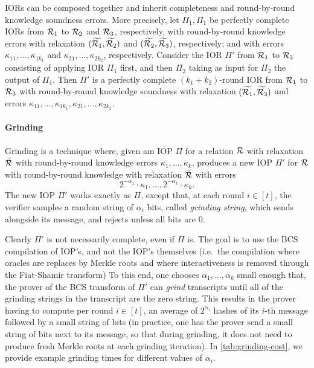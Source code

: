\documentclass[11pt,letterpaper,usenames,dvipsnames]{article}
\begin{document}
\begin{remark}\label{r:ior_compositoin}
 IORs can be composed together and inherit completeness and round-by-round knowledge soundness errors. More precisely, let $\Pi_1,\Pi_1$ be perfectly complete IORs from $\mathcal{R}_1$ to $\mathcal{R}_2$  and $\mathcal{R}_3$, respectively, with round-by-round knowledge errors  with relaxation  $(\widetilde{\mathcal{R}_1},\widetilde{\mathcal{R}_2})$ and $(\widetilde{\mathcal{R}_2},\widetilde{\mathcal{R}_3})$, respectively; and with errors $\kappa_{11},\ldots, \kappa_{1k_1}$ and $\kappa_{21}, \ldots, \kappa_{2k_2}$, respectively. Consider  the IOR $\Pi'$ from $\mathcal{R}_1$ to $\mathcal{R}_3$ consisting of applying IOR $\Pi_1$ first, and then $\Pi_2$ taking as input for $\Pi_2$ the output of $\Pi_1$.   Then $\Pi'$ is a perfectly complete $(k_1+k_2)$-round IOR from $\mathcal{R}_1$ to $\mathcal{R}_3$ with round-by-round knowledge soundness  with relaxation $(\widetilde{\mathcal{R}_1},\widetilde{\mathcal{R}_3})$ and errors $\kappa_{11},\ldots, \kappa_{1k_1}, \kappa_{21}, \ldots, \kappa_{2k_2}$.
%
\end{remark}


\paragraph{Grinding}
 Grinding \cite{?} is a technique where, given am IOP $\Pi$ for a relation $\mathcal{R}$ with relaxation $\widetilde{\mathcal{R}}$ with round-by-round knowledge errors $\kappa_1,\ldots, \kappa_k$,  produces a new IOP $\Pi'$ for $\mathcal{R}$ with   round-by-round knowledge with relaxation $\widetilde{\mathcal{R}}$ with errors $$2^{-\alpha_1}\cdot \kappa_1,\ldots, 2^{-\alpha_k}\cdot \kappa_k.$$ The new IOP $\Pi'$ works exactly as $\Pi$, except that, at each round $i\in [t]$, the verifier samples a random string of $\alpha_i$ bits, called \emph{grinding string}, which sends alongside its message, and rejects unless all bits are $0$. 

 Clearly $\Pi'$ is not  necessarily complete, even if $\Pi$ is. The goal is to use the BCS compilation of IOP's, and not the IOP's themselves (i.e.\ the compilation where oracles are replaces by Merkle roots and where interactiveness is removed through the Fiat-Shamir transform) To this end, one chooses $\alpha_1, \ldots, \alpha_k$ small enough that, the prover of the BCS transform of $\Pi'$ can \emph{grind} transcripts until all of the grinding strings in the transcript are the zero string. This results in the prover having to compute  per round $i\in [t]$, an average of $2^{\alpha_i}$  hashes of its $i$-th message followed by a small string of bits (in practice, one has the prover send a small string of bits next to its message, so that during grinding, it does not need to produce fresh Merkle roots at each grinding iteration). In \cref{tab:grinding-cost}, we provide example grinding times for different values of $\alpha_i$.
 
\end{document}
